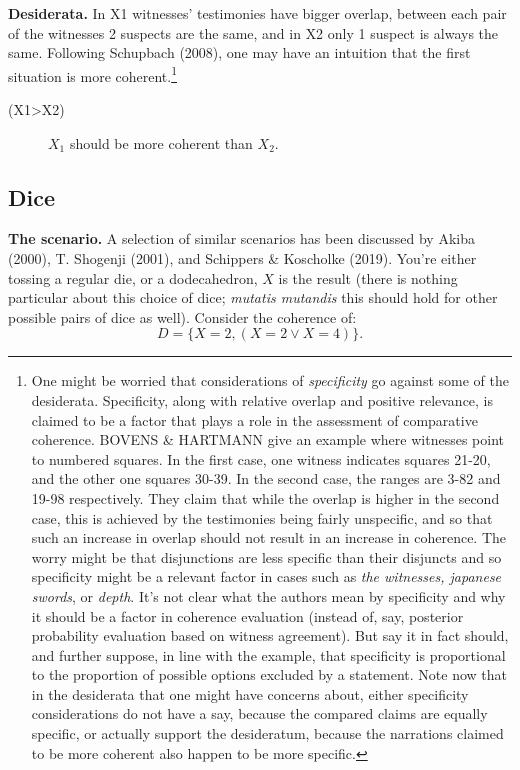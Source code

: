 \documentclass[10pt,]{scrartcl}
\newcommand{\s}[1]{\mbox{\textsf{#1}}}
\begin{document}
\noindent \textbf{Desiderata.} In \s{X1} witnesses' testimonies have
bigger overlap, between each pair of the witnesses 2 suspects are the
same, and in \s{X2} only 1 suspect is always the same. Following
Schupbach (2008), one may have an intuition that the first situation is
more
coherent.\footnote{One might be worried that considerations of \emph{specificity} go against some of the desiderata. Specificity, along with relative overlap and positive relevance, is claimed to be a factor that plays a role in the assessment of comparative coherence. BOVENS \& HARTMANN give an example where witnesses point to numbered squares. In the first case, one witness indicates squares 21-20, and the other one squares 30-39. In the second case, the ranges are 3-82 and 19-98 respectively. They claim that while the overlap is higher in the second case, this is achieved by the testimonies being fairly unspecific, and so that such an increase in overlap should not result in an increase in coherence. The worry might be that disjunctions are less specific than their disjuncts and so specificity might be a relevant factor in cases such as \emph{the witnesses, japanese swords}, or \emph{depth}. It's not clear what the authors mean by specificity and why it should be a factor in coherence evaluation (instead of, say, posterior probability evaluation based on witness agreement). But say  it in fact should, and further  suppose, in line with the example, that specificity  is proportional to the proportion of possible options excluded by a statement.  Note now  that in the desiderata that one might have concerns about, either specificity considerations do not have a say, because the compared claims are equally specific, or actually support the desideratum, because the narrations claimed to be more coherent also  happen to be more specific.
} \vspace{2mm}

\begin{description}
    \item[(\s{X1\textgreater X2})] $X_1$  should be more coherent than $X_2$.
\end{description}

\vspace{2mm}

\subsection{Dice}

\textbf{The scenario.} A selection of similar scenarios has been
discussed by Akiba (2000), T. Shogenji (2001), and Schippers \&
Koscholke (2019). You're either tossing a regular die, or a
dodecahedron, \(X\) is the result (there is nothing particular about
this choice of dice; \emph{mutatis mutandis} this should hold for other
possible pairs of dice as well). Consider the coherence of:
\[D = \{X=2, (X=2\vee X=4)\}.\]
\end{document}
